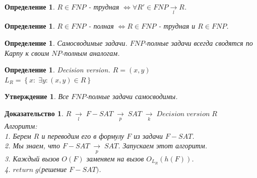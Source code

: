 \documentclass{beamer}
\theoremstyle{plain}
\newtheorem{state}[thm]{Утверждение}
\newtheorem{proof-rus}[thm]{Доказательство}
\newtheorem{dfn}[thm]{Определение}
\theoremstyle{definition}
\begin{document}
\begin{frame}
    \begin{dfn}
        $R \in FNP$ - трудная $\Leftrightarrow \forall R'\in FNP \underset{l}{\rightarrow} R$.
    \end{dfn}
    \begin{dfn}
        $R \in FNP$ - полная $\Leftrightarrow R\in FNP$ - трудная и $ R\in FNP$.
    \end{dfn}
    \begin{dfn}
        Самосводимые задачи.
        $FNP$-полные задачи всегда сводятся по Карпу к своим $NP$-полным аналогам.
    \end{dfn}
    \begin{dfn}
        Decision version.
        $R={(x,y)}$ \\
        $L_{R}= \left \{ x: \; \exists y: (x,y) \in R \right \}$
    \end{dfn}
\end{frame}

\begin{frame}
    \begin{state}
        Все $FNP$-полные задачи самосводимы.
    \end{state}
    \begin{proof-rus}
        $R \; \underset{l}{\rightarrow} \; F-SAT \; \underset{p}{\rightarrow} \; SAT \; \underset{k}{\rightarrow} \; Decision \; version \; R$ \\
        Алгоритм: \\
        1. Берем $R$ и переводим его в формулу $F$ из задачи $F-SAT$. \\
        2. Мы знаем, что $F-SAT \; \underset{p}{\rightarrow} \; SAT$. Запускаем этот алгоритм. \\
        3. Каждый вызов $O(F)$ заменяем на вызов $O_{L_{R}}(h(F))$. \\
        4. $return \; g($решение $F-SAT)$.
    \end{proof-rus}
\end{frame}
\end{document}
